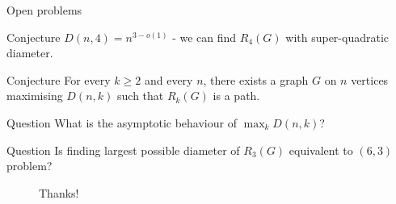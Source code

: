 \begin{frame}{Open problems}
    \begin{fact}{Conjecture} 
        \(D(n,4)=n^{3-o(1)}\) - we can find \(R_4(G)\) with super-quadratic diameter.
    \end{fact}
    \pause
    \begin{fact}{Conjecture}
        For every \(k \geq 2\) and every \(n\), there exists a graph \(G\) on \(n\) vertices maximising \(D(n,k)\) such that \(R_k(G)\) is a path.
    \end{fact}
    \pause
    \begin{fact}{Question}
        What is the asymptotic behaviour of \(\max_k D(n,k)\)?
    \end{fact}
    \pause
    \begin{fact}{Question}
        Is finding largest possible diameter of \(R_3(G)\) equivalent to \((6,3)\) problem?
    \end{fact}
    \vspace{1em}
    \pause
    \begin{figure}
        \centering
        \Large\textcolor{cfred}{Thanks!}
    \end{figure}
\end{frame}